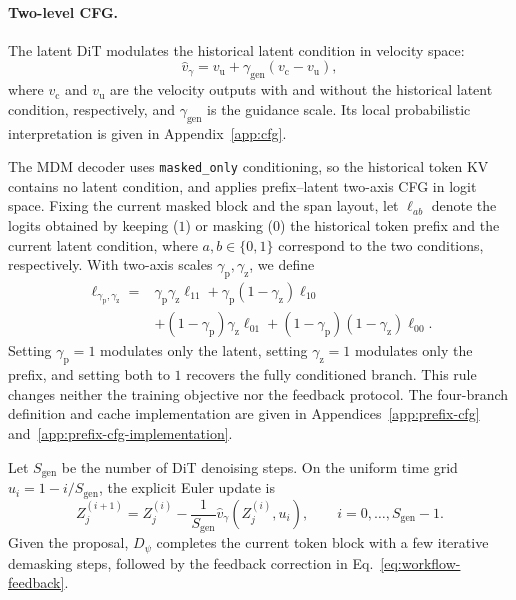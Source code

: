 \paragraph{Two-level CFG.}
The latent DiT modulates the historical latent condition in velocity space:
\begin{equation}
    \hat v_\gamma=v_{\mathrm u}+\gamma_{\mathrm{gen}}(v_{\mathrm c}-v_{\mathrm u}),
    \label{eq:workflow-cfg}
\end{equation}
where $v_{\mathrm c}$ and $v_{\mathrm u}$ are the velocity outputs with and without the historical latent condition, respectively, and $\gamma_{\mathrm{gen}}$ is the guidance scale. Its local probabilistic interpretation is given in Appendix~\ref{app:cfg}.

The MDM decoder uses \texttt{masked\_only} conditioning, so the historical token KV contains no latent condition, and applies prefix--latent two-axis CFG in logit space. Fixing the current masked block and the span layout, let $\ell_{ab}$ denote the logits obtained by keeping ($1$) or masking ($0$) the historical token prefix and the current latent condition, where $a,b\in\{0,1\}$ correspond to the two conditions, respectively. With two-axis scales $\gamma_{\mathrm p},\gamma_{\mathrm z}$, we define
\begin{equation}
\begin{aligned}
    \ell_{\gamma_{\mathrm p},\gamma_{\mathrm z}}
    ={}&\gamma_{\mathrm p}\gamma_{\mathrm z}\ell_{11}
      +\gamma_{\mathrm p}(1-\gamma_{\mathrm z})\ell_{10}\\
      &+(1-\gamma_{\mathrm p})\gamma_{\mathrm z}\ell_{01}
      +(1-\gamma_{\mathrm p})(1-\gamma_{\mathrm z})\ell_{00}.
\end{aligned}
\label{eq:workflow-prefix-cfg}
\end{equation}
Setting $\gamma_{\mathrm p}=1$ modulates only the latent, setting $\gamma_{\mathrm z}=1$ modulates only the prefix, and setting both to $1$ recovers the fully conditioned branch. This rule changes neither the training objective nor the feedback protocol. The four-branch definition and cache implementation are given in Appendices~\ref{app:prefix-cfg} and~\ref{app:prefix-cfg-implementation}.

Let $S_{\mathrm{gen}}$ be the number of DiT denoising steps. On the uniform time grid $u_i=1-i/S_{\mathrm{gen}}$, the explicit Euler update is
\begin{equation}
    Z_j^{(i+1)}
    =Z_j^{(i)}
    -\frac{1}{S_{\mathrm{gen}}}
    \hat v_\gamma\!\left(Z_j^{(i)},u_i\right),
    \qquad i=0,\ldots,S_{\mathrm{gen}}-1.
    \label{eq:workflow-euler}
\end{equation}
Given the proposal, $D_\psi$ completes the current token block with a few iterative demasking steps, followed by the feedback correction in Eq.~\eqref{eq:workflow-feedback}.

